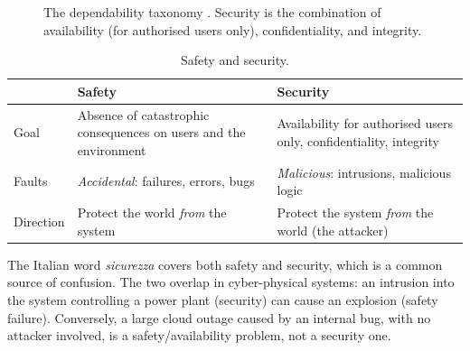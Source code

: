 \begin{figure}[H]
\centering
{}
\caption{The dependability taxonomy \cite{avizienis2004}. Security is the combination of availability (for authorised users only), confidentiality, and integrity.}
\label{fig:dependability}
\end{figure}

\begin{table}[H]
\centering
\caption{Safety and security.}
\label{tab:safety-security}
\begin{tabularx}{\textwidth}{@{}l X X@{}}
\toprule
 & Safety & Security \\
\midrule
Goal          & Absence of catastrophic consequences on users and the environment & Availability for authorised users only, confidentiality, integrity \\
Faults        & \emph{Accidental}: failures, errors, bugs & \emph{Malicious}: intrusions, malicious logic \\
Direction     & Protect the world \emph{from} the system & Protect the system \emph{from} the world (the attacker) \\
\bottomrule
\end{tabularx}
\end{table}

\begin{remark}
The Italian word \emph{sicurezza} covers both safety and security, which is a common source of confusion. The two overlap in cyber-physical systems: an intrusion into the system controlling a power plant (security) can cause an explosion (safety failure). Conversely, a large cloud outage caused by an internal bug, with no attacker involved, is a safety/availability problem, not a security one.
\end{remark}

